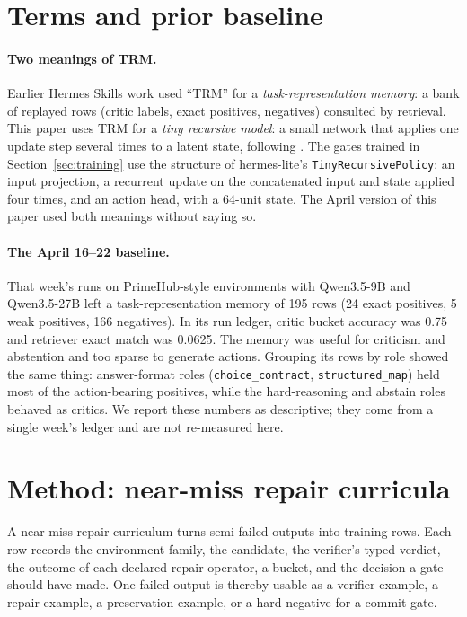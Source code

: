 \documentclass[11pt]{article}
\begin{document}
\section{Terms and prior baseline}
\label{sec:baseline}

\paragraph{Two meanings of TRM.} Earlier Hermes Skills work used ``TRM'' for a \emph{task-representation memory}: a bank of replayed rows (critic labels, exact positives, negatives) consulted by retrieval. This paper uses TRM for a \emph{tiny recursive model}: a small network that applies one update step several times to a latent state, following \citet{jolicoeurmartineau2025trm}. The gates trained in Section~\ref{sec:training} use the structure of hermes-lite's \texttt{TinyRecursivePolicy}: an input projection, a recurrent update on the concatenated input and state applied four times, and an action head, with a 64-unit state. The April version of this paper used both meanings without saying so.

\paragraph{The April 16--22 baseline.} That week's runs on PrimeHub-style environments with Qwen3.5-9B and Qwen3.5-27B left a task-representation memory of 195 rows (24 exact positives, 5 weak positives, 166 negatives). In its run ledger, critic bucket accuracy was 0.75 and retriever exact match was 0.0625. The memory was useful for criticism and abstention and too sparse to generate actions. Grouping its rows by role showed the same thing: answer-format roles (\texttt{choice\_contract}, \texttt{structured\_map}) held most of the action-bearing positives, while the hard-reasoning and abstain roles behaved as critics. We report these numbers as descriptive; they come from a single week's ledger and are not re-measured here.

\section{Method: near-miss repair curricula}
\label{sec:method}

A near-miss repair curriculum turns semi-failed outputs into training rows. Each row records the environment family, the candidate, the verifier's typed verdict, the outcome of each declared repair operator, a bucket, and the decision a gate should have made. One failed output is thereby usable as a verifier example, a repair example, a preservation example, or a hard negative for a commit gate.
\end{document}
